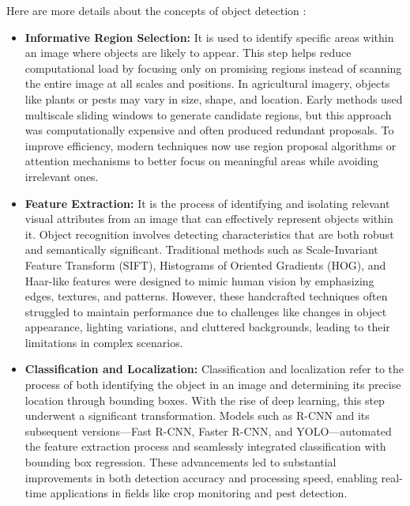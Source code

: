 Here are more details about the concepts of object detection \parencite{zhao2019objectdetection}: 
\begin{itemize}
    \item \textbf{Informative Region Selection:} It is used to identify specific areas within an image where objects are likely to appear. This step helps reduce computational load by focusing only on promising regions instead of scanning the entire image at all scales and positions. In agricultural imagery, objects like plants or pests may vary in size, shape, and location. Early methods used multiscale sliding windows to generate candidate regions, but this approach was computationally expensive and often produced redundant proposals. To improve efficiency, modern techniques now use region proposal algorithms or attention mechanisms to better focus on meaningful areas while avoiding irrelevant ones.
    \item \textbf{Feature Extraction:} It is the process of identifying and isolating relevant visual attributes from an image that can effectively represent objects within it. Object recognition involves detecting characteristics that are both robust and semantically significant. Traditional methods such as Scale-Invariant Feature Transform (SIFT), Histograms of Oriented Gradients (HOG), and Haar-like features were designed to mimic human vision by emphasizing edges, textures, and patterns. However, these handcrafted techniques often struggled to maintain performance due to challenges like changes in object appearance, lighting variations, and cluttered backgrounds, leading to their limitations in complex scenarios.
    \item \textbf{Classification and Localization:} Classification and localization refer to the process of both identifying the object in an image and determining its precise location through bounding boxes. With the rise of deep learning, this step underwent a significant transformation. Models such as R-CNN and its subsequent versions—Fast R-CNN, Faster R-CNN, and YOLO—automated the feature extraction process and seamlessly integrated classification with bounding box regression. These advancements led to substantial improvements in both detection accuracy and processing speed, enabling real-time applications in fields like crop monitoring and pest detection.
\end{itemize}


